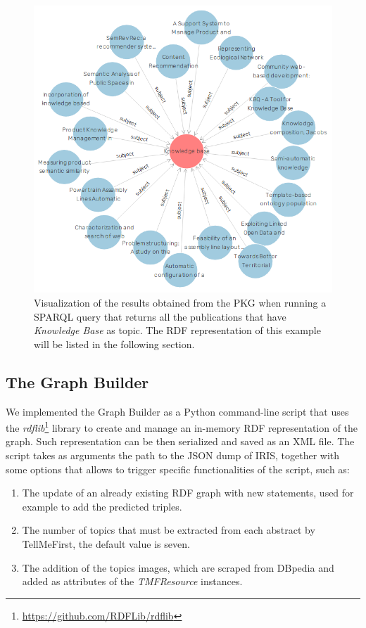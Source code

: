 \documentclass[%
    corpo=13.5pt,
    twoside,
    oldstyle,
    tipotesi=magistrale,
    greek,
    evenboxes
]{toptesi}
\begin{document}
\begin{figure}[h]
    \setlength{\belowcaptionskip}{-25pt}
    \centering
    \includegraphics[scale=0.35]{img/subject_knowledge_base.png}
    \caption{
        Visualization of the results obtained from
        the PKG when running a SPARQL query that returns
        all the publications that have \emph{Knowledge Base}
        as topic.
        The RDF representation of this example will be listed in
        the following section.
    }
    \label{fig:subject-knowledge-base}
\end{figure}



\subsection{The Graph Builder}

We implemented the Graph Builder as a Python command-line script that uses
the \emph{rdflib}\footnote{\url{https://github.com/RDFLib/rdflib}} library
to create and manage an in-memory RDF representation of the graph.
Such representation can be then serialized and saved as an XML file.
The script takes as arguments the path to the JSON dump of IRIS, together
with some options that allows to trigger specific functionalities of the
script, such as:

\begin{enumerate}
    \item The update of an already existing RDF graph with new statements,
        used for example to add the predicted triples.
    \item The number of topics that must be extracted from each abstract by
        TellMeFirst, the default value is seven.
    \item The addition of the topics images, which are scraped from DBpedia and
        added as attributes of the \emph{TMFResource} instances.
\end{enumerate}
\end{document}
